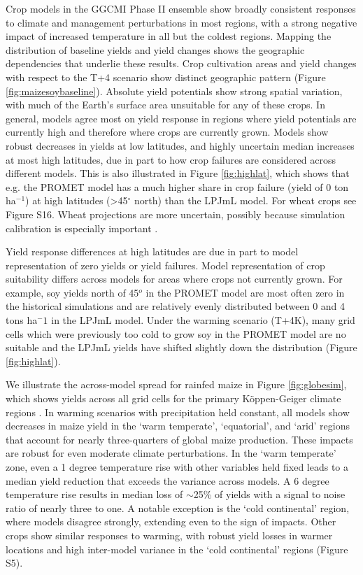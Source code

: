 \documentclass[gmd, manuscript]{copernicus} %
\begin{document}
Crop models in the GGCMI Phase II ensemble show broadly consistent responses to climate and management perturbations in most regions, with a strong negative impact of increased temperature in all but the coldest regions. 
Mapping the distribution of baseline yields and yield changes shows the geographic dependencies that underlie these results. Crop cultivation areas and yield changes with respect to the T+4 scenario show distinct geographic pattern (Figure \ref{fig:maizesoybaseline}). 
Absolute yield potentials show strong spatial variation, with much of the Earth's surface area unsuitable for any of these crops. 
In general, models agree most on yield response in regions where yield potentials are currently high and therefore where crops are currently grown. 
Models show robust decreases in yields at low latitudes, and highly uncertain median increases at most high latitudes, due in part to how crop failures are considered across different models. 
This is also illustrated in Figure \ref{fig:highlat}, which shows that e.g. the PROMET model has a much higher share in crop failure (yield of 0 ton ha$^{-1}$) at high latitudes (>45$^\circ$ north) than the LPJmL model.
For wheat crops see Figure S16.
Wheat projections are more uncertain, possibly because simulation calibration is especially important \citep[e.g.][]{Asseng2013}.

Yield response differences at high latitudes are due in part to model representation of zero yields or yield failures. Model representation of crop suitability differs across models for areas where crops not currently grown. For example, soy yields north of 45$^o$ in the PROMET model are most often zero in the historical simulations and are relatively evenly distributed between 0 and 4 tons ha$^-1$ in the LPJmL model. Under the warming scenario (T+4K), many grid cells which were previously too cold to grow soy in the PROMET model are no suitable and the LPJmL yields have shifted slightly down the distribution (Figure \ref{fig:highlat}).

We illustrate the across-model spread for rainfed maize in Figure \ref{fig:globesim}, which shows yields across all grid cells for the primary K\"{o}ppen-Geiger climate regions \citep{rubel2010}. 
In warming scenarios with precipitation held constant, all models show decreases in maize yield in the `warm temperate', `equatorial', and `arid' regions that account for nearly three-quarters of global maize production. 
These impacts are robust for even moderate climate perturbations. 
In the `warm temperate' zone, even a 1 degree temperature rise with other variables held fixed leads to a median yield reduction that exceeds the variance across models. 
A 6 degree temperature rise results in median loss of $\sim$25\% of yields with a signal to noise ratio of nearly three to one. A notable exception is the `cold continental' region, where models disagree strongly, extending even to the sign of impacts. 
Other crops show similar responses to warming, with robust yield losses in warmer locations and high inter-model variance in the `cold continental' regions (Figure S5).
\end{document}
